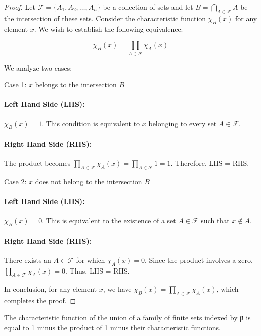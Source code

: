 \begin{proof}
  \leanok
  Let $\mathcal{F} = \{A_1, A_2, \ldots, A_n\}$ be a collection of sets and let $B = \bigcap_{A \in \mathcal{F}} A$ be the intersection of these sets. Consider the characteristic function $\chi_B(x)$ for any element $x$. We wish to establish the following equivalence:

  \begin{equation*}
  \chi_B(x) = \prod_{A \in \mathcal{F}} \chi_A(x)
  \end{equation*}

  We analyze two cases:

  Case 1: $x$ belongs to the intersection $B$

  \paragraph{Left Hand Side (LHS):} $\chi_B(x) = 1$. This condition is equivalent to $x$ belonging to every set $A \in \mathcal{F}$.

  \paragraph{Right Hand Side (RHS):} The product becomes $\prod_{A \in \mathcal{F}} \chi_A(x) = \prod_{A \in \mathcal{F}} 1 = 1$. Therefore, LHS = RHS.

  Case 2: $x$ does not belong to the intersection $B$

  \paragraph{Left Hand Side (LHS):} $\chi_B(x) = 0$. This is equivalent to the existence of a set $A \in \mathcal{F}$ such that $x \not\in A$.

  \paragraph{Right Hand Side (RHS):} There exists an $A \in \mathcal{F}$ for which $\chi_A(x) = 0$. Since the product involves a zero, $\prod_{A \in \mathcal{F}} \chi_A(x) = 0$. Thus, LHS = RHS.

  In conclusion, for any element $x$, we have $\chi_B(x) = \prod_{A \in \mathcal{F}} \chi_A(x)$, which completes the proof.

\end{proof}

\begin{lemma}\label{char_fun_FinUnion}
  The characteristic function of the union of a family of finite sets indexed by \verb|β| is equal to 1 minus the product of 1 minus their characteristic functions.
\end{lemma}

